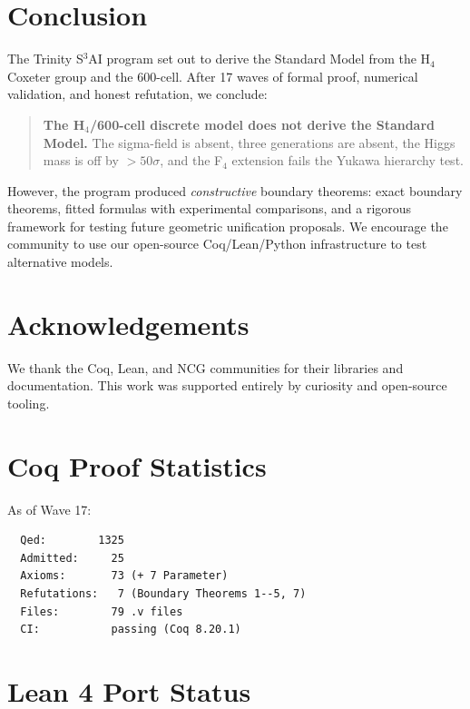 \documentclass[11pt,a4paper]{article}
\theoremstyle{definition}
\begin{document}
\section{Conclusion}\label{sec:conclusion}

The Trinity S$^3$AI program set out to derive the Standard Model from the
H$_4$ Coxeter group and the 600-cell. After 17 waves of formal proof,
numerical validation, and honest refutation, we conclude:

\begin{quote}
  \textbf{The H$_4$/600-cell discrete model does not derive the Standard
  Model.} The sigma-field is absent, three generations are absent, the
  Higgs mass is off by $> 50\sigma$, and the F$_4$ extension fails the
  Yukawa hierarchy test.
\end{quote}

However, the program produced \emph{constructive} boundary theorems:
exact boundary theorems, fitted formulas with experimental comparisons, and a rigorous framework for
testing future geometric unification proposals. We encourage the community
to use our open-source Coq/Lean/Python infrastructure to test alternative
models.

\section*{Acknowledgements}

We thank the Coq, Lean, and NCG communities for their libraries and
documentation. This work was supported entirely by curiosity and
open-source tooling.

\appendix

\section{Coq Proof Statistics}\label{app:coq}

As of Wave 17:
\begin{verbatim}
  Qed:        1325
  Admitted:     25
  Axioms:       73 (+ 7 Parameter)
  Refutations:   7 (Boundary Theorems 1--5, 7)
  Files:        79 .v files
  CI:           passing (Coq 8.20.1)
\end{verbatim}

\section{Lean 4 Port Status}\label{app:lean}
\end{document}
